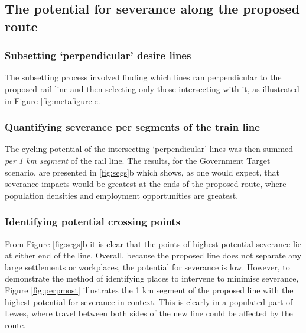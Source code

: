 \documentclass[11pt]{article}
\begin{document}
\subsection{The potential for severance along the proposed
route}\label{the-potential-for-severance-along-the-proposed-route}

\subsubsection{\texorpdfstring{Subsetting `perpendicular' desire
lines}{Subsetting perpendicular desire lines}}\label{subsetting-perpendicular-desire-lines}

The subsetting process involved finding which lines ran perpendicular to
the proposed rail line and then selecting only those intersecting with
it, as illustrated in Figure \ref{fig:metafigure}c.

\subsubsection{Quantifying severance per segments of the train
line}\label{quantifying-severance-per-segments-of-the-train-line}

The cycling potential of the intersecting `perpendicular' lines was then
summed \emph{per 1 km segment} of the rail line. The results, for the
Government Target scenario, are presented in \ref{fig:segs}b which
shows, as one would expect, that severance impacts would be greatest at
the ends of the proposed route, where population densities and
employment opportunities are greatest.

\subsubsection{Identifying potential crossing
points}\label{identifying-potential-crossing-points}

From Figure \ref{fig:segs}b it is clear that the points of highest
potential severance lie at either end of the line. Overall, because the
proposed line does not separate any large settlements or workplaces, the
potential for severance is low. However, to demonstrate the method of
identifying places to intervene to minimise severance, Figure
\ref{fig:perpmost} illustrates the 1 km segment of the proposed line
with the highest potential for severance in context. This is clearly in
a populated part of Lewes, where travel between both sides of the new
line could be affected by the route.
\end{document}
